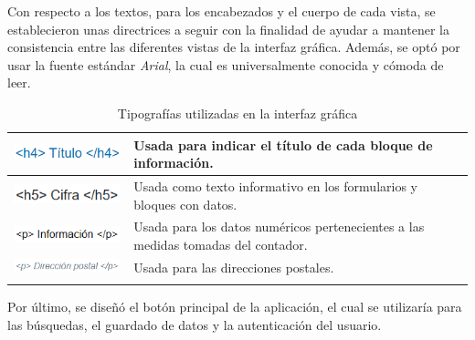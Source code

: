 \documentclass[pdftex,11pt,a4paper]{book}
\begin{document}
Con respecto a los textos, para los encabezados y el cuerpo de cada vista, se establecieron unas directrices a seguir con la finalidad de ayudar a mantener la consistencia entre las diferentes vistas de la interfaz gráfica. Además, se optó por usar la fuente estándar \textit{Arial}, la cual es universalmente conocida y cómoda de leer. 

\renewcommand{\tablename}{Tabla}
\renewcommand{\arraystretch}{1,7}

\begin{center}
\begin{longtable}{|>{\centering\arraybackslash}X m{}|m{}|}
\hline
\vspace{-5mm}\includegraphics{images/disenyo/texto-h4.png} & Usada para indicar el título de cada bloque de información.
\\ \hline
\vspace{-4mm}\includegraphics{images/disenyo/texto-h5.png} & Usada como texto informativo en los formularios y bloques con datos.
\\ \hline
\vspace{-4mm}\includegraphics{images/disenyo/texto-p1.png} & Usada para los datos numéricos pertenecientes a las medidas tomadas del contador.
\\ \hline
\vspace{-4mm}\includegraphics{images/disenyo/texto-p2.png} & Usada para las direcciones postales.

\\ \hline
\caption{Tipografías utilizadas en la interfaz gráfica} \label{tablalarga:tablaTipografía}
\end{longtable}
\end{center}

\vspace{-1,5cm}

Por último, se diseñó el botón principal de la aplicación, el cual se utilizaría para las búsquedas, el guardado de datos y la autenticación del usuario.
\end{document}
